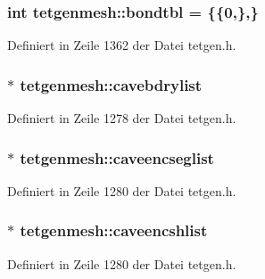 \hypertarget{classtetgenmesh_a46550a87561b0b4a7dfc7a312b03d3ea}{
\subsubsection[{bondtbl}]{\setlength{\rightskip}{0pt plus 5cm}int tetgenmesh\-::bondtbl = \{\{0,\},\}\hspace{0.3cm}{\ttfamily [static]}}}\label{classtetgenmesh_a46550a87561b0b4a7dfc7a312b03d3ea}


Definiert in Zeile 1362 der Datei tetgen.\-h.

\hypertarget{classtetgenmesh_ac980ac60072a3330be92f91d12196c0c}{
\subsubsection[{cavebdrylist}]{ $\ast$ tetgenmesh\-::cavebdrylist}}\label{classtetgenmesh_ac980ac60072a3330be92f91d12196c0c}


Definiert in Zeile 1278 der Datei tetgen.\-h.

\hypertarget{classtetgenmesh_a43a19aabf2c098353a32e5630457c3e6}{
\subsubsection[{caveencseglist}]{ $\ast$ tetgenmesh\-::caveencseglist}}\label{classtetgenmesh_a43a19aabf2c098353a32e5630457c3e6}


Definiert in Zeile 1280 der Datei tetgen.\-h.

\hypertarget{classtetgenmesh_a1cc8d43a2822a2a6051edb36441818cd}{
\subsubsection[{caveencshlist}]{$\ast$ tetgenmesh\-::caveencshlist}}\label{classtetgenmesh_a1cc8d43a2822a2a6051edb36441818cd}


Definiert in Zeile 1280 der Datei tetgen.\-h.

